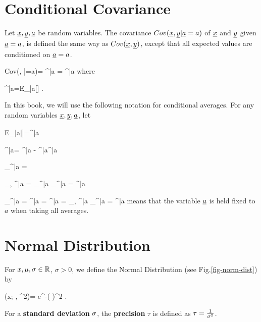 \section{Conditional Covariance}
\label{sec-cond-cov}
Let $\rvx, \rvy, \rva$
be random variables.
The covariance $Cov(\rvx, \rvy|\rva=a)$
of $\rvx$ and $\rvy$
given $\rva=a$, is defined
the same
way as $Cov(\rvx, \rvy)$,
except that all
expected values are
conditioned on $\rva=a$.



\beq
Cov(\rvx, \rvy|\rva=a)=
\av{\rvx, \rvy}^{|a}
=
^{|a}
\eeq
where

\beq
\av{\rvx}^{|a}=E_{\rvx|a}[\rvx]
\;.
\eeq

In this book, we will use the following notation
for conditional averages.
For any random
variables $\rvx, \rvy, \rva$, let

\beq
E_{|a}[\rvx]=\av{\rvx}^{|a}
\quad{}
\eeq

\beq
\av{\rvx, \rvy}^{|a}=
\av{\rvx\rvy}^{|a}
-
\av{\rvx}^{|a}\av{\rvy}^{|a}
\quad{}
\eeq

\beq
\s_\rvx^{|a} =
\quad {}
\eeq

\beq
\rho_{\rvx, \rvy}^{|a} 
=
{\s_\rvx^{|a} \s_\rvy^{|a}}
=
\left[
\frac{\av{\rvx, \rvy}}
{\s_\rvx \s_\rvy}
\right]^{|a}
\quad {}
\eeq

\beq
\partial_\rvx^{|a}\rvy
=
\left[\pder{}{\rvx}\right]^{|a}\rvy
=
{\av{\rvx, \rvx}^{|a}}
=
\rho_{\rvx, \rvy}^{|a}
{\s_\rvx^{|a}}
=
\left[
\rho_{\rvx, \rvy}\frac{
\s_\rvy}
{\s_\rvx}\right]^{|a}
\quad{}
\eeq
{} means that the variable
$\rva$ is held fixed to $a$
when taking all averages.





\section{Normal Distribution}


For $x, \mu, \sigma\in { \mathbb{R}}$,
$\sigma >0$, we define the Normal Distribution
(see Fig.\ref{fig-norm-dist}) by

\beq
\caln(x; \mu, \sigma^2)=
e^{-\;\left(
\right)^2}
\;.
\eeq

For a {\bf standard deviation}
$\sigma$, the {\bf precision} $\tau$
is defined as $\tau=\frac{1}{\sigma^2}$.

